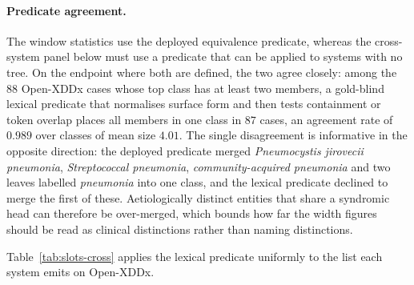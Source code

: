 \documentclass[letterpaper]{article}
\begin{document}
\paragraph{Predicate agreement.}
The window statistics use the deployed equivalence predicate, whereas the cross-system panel below must use a predicate that can be applied to systems with no tree.
On the endpoint where both are defined, the two agree closely: among the $88$ Open-XDDx cases whose top class has at least two members, a gold-blind lexical predicate that normalises surface form and then tests containment or token overlap places all members in one class in $87$ cases, an agreement rate of $0.989$ over classes of mean size $4.01$.
The single disagreement is informative in the opposite direction: the deployed predicate merged \emph{Pneumocystis jirovecii pneumonia}, \emph{Streptococcal pneumonia}, \emph{community-acquired pneumonia} and two leaves labelled \emph{pneumonia} into one class, and the lexical predicate declined to merge the first of these.
Aetiologically distinct entities that share a syndromic head can therefore be over-merged, which bounds how far the width figures should be read as clinical distinctions rather than naming distinctions.

Table~\ref{tab:slots-cross} applies the lexical predicate uniformly to the list each system emits on Open-XDDx.
\end{document}
